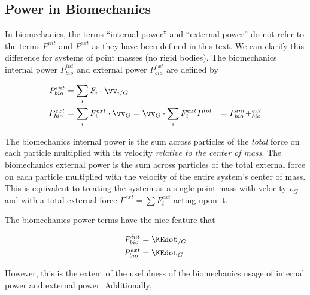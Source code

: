 \subsection*{Power in Biomechanics}
\label{sec:Power in Biomechanics}

In biomechanics, the terms ``internal power'' and ``external power'' do not
refer to the terms $P^{int}$ and $P^{ext}$ as they have been defined in this
text. We can clarify this difference for systems of point masses (no rigid
bodies). The biomechanics internal power $P_{bio}^{int}$ and external power
$P_{bio}^{ext}$ are defined by

\begin{align}
P_{bio}^{int} &= \sum_{i} F_{i} \cdot \vv_{i/G} \\
P_{bio}^{ext} &= \sum_{i} F_{i}^{ext} \cdot \vv_{G} = \vv_{G} \cdot \sum_{i} F_{i}^{ext}
P^{tot} &= P_{bio}^{int} + _{bio}^{ext} \\
\end{align}

The biomechanics internal power is the sum across particles of the \emph{total}
force on each particle multiplied with its velocity \emph{relative to the
center of mass}. The biomechanics external power is the sum across particles of
the total external force on each particle multiplied with the velocity of the
entire system's center of mass. This is equivalent to treating the system as a
single point mass with velocity $v_{G}$ and with a total external force
$F^{ext} = \sum F_{i}^{ext}$ acting upon it.

The biomechanics power terms have the nice feature that

\begin{align}
P_{bio}^{int} &= \KEdot_{/G} \label{eq:PbioInt}  \\
P_{bio}^{ext} &= \KEdot_{G}  \label{eq:PbioExt}
\end{align}

However, this is the extent of the usefulness of the biomechanics usage of internal power and external power. Additionally, 

